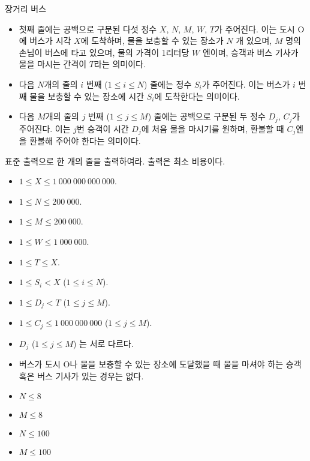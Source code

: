 \begin{problem}{장거리 버스}
	\begin{itemize}
		\item 첫째 줄에는 공백으로 구분된 다섯 정수 $X$, $N$, $M$, $W$, $T$가 주어진다. 이는 도시 O에 버스가 시각 $X$에 도착하며, 물을 보충할 수 있는 장소가 $N$ 개 있으며, $M$ 명의 손님이 버스에 타고 있으며, 물의 가격이 1리터당 $W$ 엔이며, 승객과 버스 기사가 물을 마시는 간격이 $T$라는 의미이다.
		\item 다음 $N$개의 줄의 $i$ 번째 ($1 \le i \le N$) 줄에는 정수 $S_i$가 주어진다. 이는 버스가 $i$ 번째 물을 보충할 수 있는 장소에 시간 $S_i$에 도착한다는 의미이다.
		\item 다음 $M$개의 줄의 $j$ 번째 ($1 \le j \le M$) 줄에는 공백으로 구분된 두 정수 $D_j$, $C_j$가 주어진다. 이는 $j$번 승객이 시간 $D_j$에 처음 물을 마시기를 원하며, 환불할 때 $C_j$엔을 환불해 주어야 한다는 의미이다.
	\end{itemize}

	
	\OutputFile
	
	표준 출력으로 한 개의 줄을 출력하여라. 출력은 최소 비용이다.
	
	\Constraints
	
	\begin{itemize}
	
	\item $1 \le X \le 1\ 000\ 000\ 000\ 000$.
	\item $1 \le N \le 200\ 000$.
	\item $1 \le M \le 200\ 000$.
	\item $1 \le W \le 1\ 000\ 000$.
	\item $1 \le T \le X$.
	\item $1 \le S_i < X$ ($1 \le i \le N$).
	\item $1 \le D_j < T$ ($1 \le j \le M$).
	\item $1 \le C_j \le 1\ 000\ 000\ 000$ ($1 \le j \le M$).
	\item $D_j$ ($1 \le j \le M$) 는 서로 다르다.
	\item 버스가 도시 O나 물을 보충할 수 있는 장소에 도달했을 때 물을 마셔야 하는 승객 혹은 버스 기사가 있는 경우는 없다.
	\end{itemize}
	
	
	\begin{itemize}
		\item $N \le 8$
		\item $M \le 8$
	\end{itemize}


	\begin{itemize}
		\item $N \le 100$
		\item $M \le 100$
	\end{itemize}


\end{problem}
